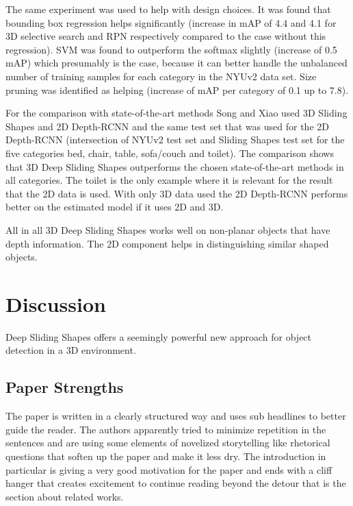 \documentclass[12pt]{scrartcl}
\begin{document}
The same experiment was used to help with design choices. It was found that
bounding box regression helps significantly (increase in mAP of 4.4 and 4.1
for 3D selective search and RPN respectively compared to the case without this
regression). SVM was found to outperform the softmax slightly (increase of 0.5 mAP)
which presumably is the case, because it can better handle the unbalanced number of
training samples for each category in the NYUv2 data set. Size pruning was identified
as helping (increase of mAP per category of 0.1 up to 7.8).

For the comparison with state-of-the-art methods Song and Xiao used 3D Sliding
Shapes\cite{Song2014} and 2D Depth-RCNN\cite{Gupta2015} and the same test set
that was used for the 2D Depth-RCNN (intersection of NYUv2 test set and Sliding
Shapes test set for the five categories bed, chair, table, sofa/couch and toilet).
The comparison shows that 3D Deep Sliding Shapes outperforms the chosen state-of-the-art
methods in all categories. The toilet is the only example where it is relevant
for the result that the 2D data is used. With only 3D data used the 2D Depth-RCNN
performs better on the estimated model if it uses 2D and 3D.

All in all 3D Deep Sliding Shapes works well on non-planar objects that have depth
information. The 2D component helps in distinguishing similar shaped objects.

\section{Discussion} %
\label{sec:discussion}

Deep Sliding Shapes offers a seemingly powerful new approach for object detection
in a 3D environment.

\subsection{Paper Strengths} %
\label{sub:paper_strengths}

The paper is written in a clearly structured way and uses sub headlines to
better guide the reader. The authors apparently tried to minimize repetition
in the sentences and are using some elements of novelized storytelling like
rhetorical questions that soften up the paper and make it less dry. The introduction
in particular is giving a very good motivation for the paper and ends with a cliff
hanger that creates excitement to continue reading beyond the detour that is
the section about related works.
\end{document}
